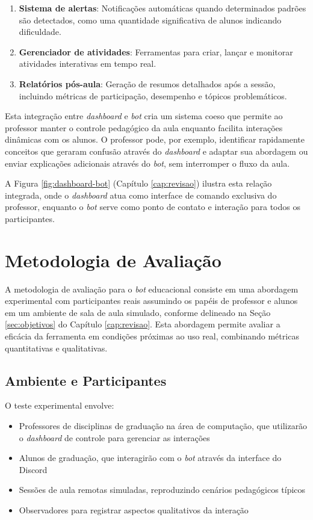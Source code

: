 \begin{enumerate}
\item \textbf{Sistema de alertas}: Notificações automáticas quando determinados
padrões são detectados, como uma quantidade significativa de alunos indicando
dificuldade.
\item \textbf{Gerenciador de atividades}: Ferramentas para criar, lançar e
monitorar atividades interativas em tempo real.
\item \textbf{Relatórios pós-aula}: Geração de resumos detalhados após a sessão,
incluindo métricas de participação, desempenho e tópicos problemáticos.
\end{enumerate}

Esta integração entre \textit{dashboard} e \textit{bot} cria um sistema coeso
que permite ao professor manter o controle pedagógico da aula enquanto facilita
interações dinâmicas com os alunos. O professor pode, por exemplo, identificar
rapidamente conceitos que geraram confusão através do \textit{dashboard} e
adaptar sua abordagem ou enviar explicações adicionais através do \textit{bot},
sem interromper o fluxo da aula.

A Figura \ref{fig:dashboard-bot} (Capítulo \ref{cap:revisao}) ilustra esta
relação integrada, onde o \textit{dashboard} atua como interface de comando
exclusiva do professor, enquanto o \textit{bot} serve como ponto de contato e
interação para todos os participantes.

\section{Metodologia de Avaliação}
\label{sec:metodologia}

A metodologia de avaliação para o \textit{bot} educacional consiste em uma
abordagem experimental com participantes reais assumindo os papéis de professor
e alunos em um ambiente de sala de aula simulado, conforme delineado na Seção
\ref{sec:objetivos} do Capítulo \ref{cap:revisao}. Esta abordagem permite
avaliar a eficácia da ferramenta em condições próximas ao uso real, combinando
métricas quantitativas e qualitativas.

\subsection{Ambiente e Participantes}
\label{subsec:ambiente}

O teste experimental envolve:
\begin{itemize}
\item Professores de disciplinas de graduação na área de computação, que
utilizarão o \textit{dashboard} de controle para gerenciar as interações
\item Alunos de graduação, que interagirão com o \textit{bot} através da
interface do Discord
\item Sessões de aula remotas simuladas, reproduzindo cenários pedagógicos
típicos
\item Observadores para registrar aspectos qualitativos da interação
\end{itemize}

